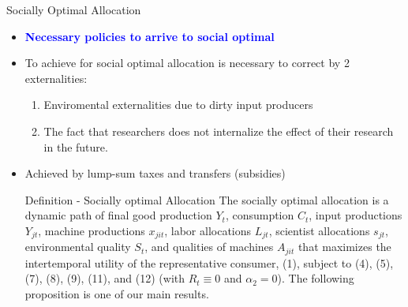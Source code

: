 \documentclass[aspectratio=169,xcolor=dvipsnames]{beamer}
\begin{document}
\begin{frame}{Socially Optimal Allocation}
    \begin{itemize}
        \item \textcolor{blue}{\textbf{Necessary policies to arrive to social optimal}}
        \item To achieve for social optimal allocation is necessary to correct by 2 externalities:
        \begin{enumerate}
            \item Enviromental externalities due to dirty input producers
            \item The fact that researchers does not internalize the effect of their research in the future.
        \end{enumerate}
        \item Achieved by lump-sum taxes and transfers (subsidies)
        \begin{block}{Definition - Socially optimal Allocation}
        The socially optimal allocation is a dynamic path of final good production $Y_t$, consumption $C_t$, input productions $Y_{jt}$, machine productions $x_{jit}$, labor allocations $L_{jt}$, scientist allocations $s_{jt}$, environmental quality $S_t$, and qualities of machines $A_{jit}$ that maximizes the intertemporal utility of the representative consumer, (1), subject to (4), (5), (7), (8), (9), (11), and (12) (with $R_t \equiv 0$ and $\alpha_2 = 0$). The following proposition is one of our main results.
        \end{block}
    \end{itemize}
\end{frame}
\end{document}
